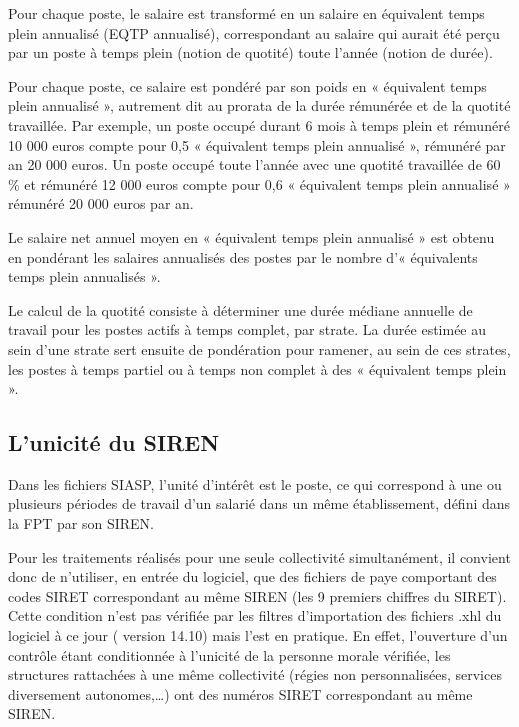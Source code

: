 \documentclass[]{article}
\begin{document}
Pour chaque poste, le salaire est transformé en un salaire en équivalent
temps plein annualisé (EQTP annualisé), correspondant au salaire qui
aurait été perçu par un poste à temps plein (notion de quotité) toute
l'année (notion de durée).

Pour chaque poste, ce salaire est pondéré par son poids en « équivalent
temps plein annualisé », autrement dit au prorata de la durée rémunérée
et de la quotité travaillée. Par exemple, un poste occupé durant 6 mois
à temps plein et rémunéré 10 000 euros compte pour 0,5 « équivalent
temps plein annualisé », rémunéré par an 20 000 euros. Un poste occupé
toute l'année avec une quotité travaillée de 60 \% et rémunéré 12 000
euros compte pour 0,6 « équivalent temps plein annualisé » rémunéré 20
000 euros par an.

Le salaire net annuel moyen en « équivalent temps plein annualisé » est
obtenu en pondérant les salaires annualisés des postes par le nombre d'«
équivalents temps plein annualisés ».

Le calcul de la quotité consiste à déterminer une durée médiane annuelle
de travail pour les postes actifs à temps complet, par strate. La durée
estimée au sein d'une strate sert ensuite de pondération pour ramener,
au sein de ces strates, les postes à temps partiel ou à temps non
complet à des « équivalent temps plein ».

\subsection{L'unicité du SIREN}\label{lunicite-du-siren}

Dans les fichiers SIASP, l'unité d'intérêt est le poste, ce qui
correspond à une ou plusieurs périodes de travail d'un salarié dans un
même établissement, défini dans la FPT par son SIREN.

Pour les traitements réalisés pour une seule collectivité simultanément,
il convient donc de n'utiliser, en entrée du logiciel, que des fichiers
de paye comportant des codes SIRET correspondant au même SIREN (les 9
premiers chiffres du SIRET). Cette condition n'est pas vérifiée par les
filtres d'importation des fichiers .xhl du logiciel à ce jour ( version
14.10) mais l'est en pratique. En effet, l'ouverture d'un contrôle étant
conditionnée à l'unicité de la personne morale vérifiée, les structures
rattachées à une même collectivité (régies non personnalisées, services
diversement autonomes,\ldots{}) ont des numéros SIRET correspondant au
même SIREN.
\end{document}
